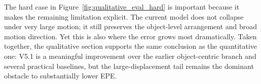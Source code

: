 The hard case in Figure~\ref{fig:qualitative_eval_hard} is important because it makes the remaining limitation explicit. The current model does not collapse under very large motion; it still preserves the object-level arrangement and broad motion direction. Yet this is also where the error grows most dramatically. Taken together, the qualitative section supports the same conclusion as the quantitative one: V5.1 is a meaningful improvement over the earlier object-centric branch and several practical baselines, but the large-displacement tail remains the dominant obstacle to substantially lower EPE.
